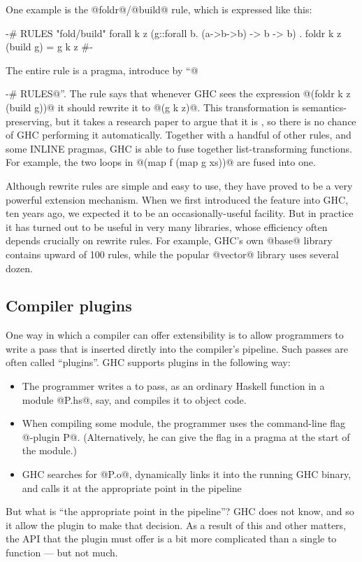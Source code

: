 \documentclass{article}
\let\cite=\citep
\begin{document}
One example is the @foldr@/@build@ rule, which is expressed like this:
\begin{code}
{-# RULES "fold/build"    
    forall k z (g::forall b. (a->b->b) -> b -> b) . 
       foldr k z (build g) = g k z
 #-}
\end{code}
The entire rule is a pragma, introduce by ``@{-# RULES@''.  
The rule says that whenever GHC sees the expression @(foldr k z (build g))@
it should rewrite it to @(g k z)@.  This transformation is
semantics-preserving, but it takes a research paper to argue that it
is \cite{gill:short-cut}, so there is no chance of GHC performing it automatically.
Together with a handful of other rules, and
some INLINE pragmas, GHC is able to fuse together list-transforming functions.
For example, the two loops in @(map f (map g xs))@ are fused into one.

Although rewrite rules are simple and easy to use, they have proved to
be a very powerful extension mechanism.  When we first introduced
the feature into GHC, ten years ago, we expected it to be an
occasionally-useful facility.  But in practice it has turned out to be
useful in very many libraries, whose efficiency often depends
crucially on rewrite rules.  For example, GHC's own @base@ library
contains upward of 100 rules, while the popular @vector@ library uses
several dozen.

\subsection{Compiler plugins}

One way in which a compiler can offer extensibility is to allow
programmers to write a pass that is inserted dirctly into the 
compiler's pipeline.  Such passes are often called ``plugins''.
GHC supports plugins in the following way:
\begin{itemize}
\item The programmer writes a \Core{} to \Core{} pass, as an ordinary
Haskell function in a module @P.hs@, say,
and compiles it to object code.  
\item When compiling some module, the programmer uses the command-line 
flag @-plugin P@.  (Alternatively, he can give the flag in a pragma
at the start of the module.)
\item GHC searches for @P.o@, dynamically links it into the running
GHC binary, and calls it at the appropriate point in the pipeline
\end{itemize}
But what is ``the appropriate point in the pipeline''?  GHC does not know,
and so it allow the plugin to make that decision.  As a result of this and
other matters, the API that the plugin must offer is a bit more complicated
than a single \Core{} to \Core{} function --- but not much.  

}
\end{document}
